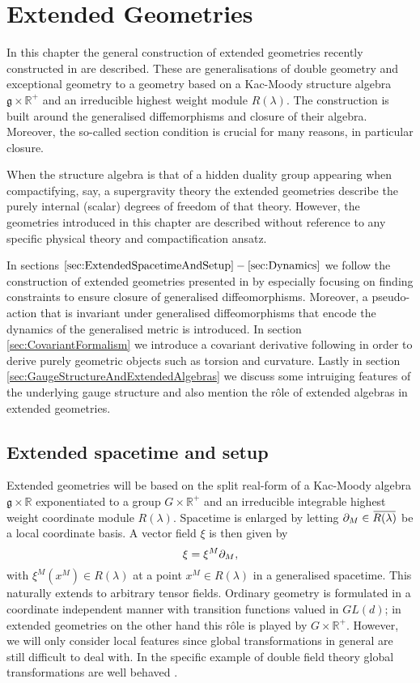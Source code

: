 \chapter{Extended Geometries}\label{chap:ExtendedGeometries}
In this chapter the general construction of extended geometries recently constructed in \cite{CederwallPalmkvist2017} are described. These are generalisations of double geometry and exceptional geometry to a geometry based on a Kac-Moody structure algebra $\mathfrak{g}\times\mathbb{R}^+$ and an irreducible highest weight module $R(\lambda)$. The construction is built around the generalised diffemorphisms and closure of their algebra. Moreover, the so-called section condition is crucial for many reasons, in particular closure.

When the structure algebra is that of a hidden duality group appearing when compactifying, say, a supergravity theory the extended geometries describe the purely internal (scalar) degrees of freedom of that theory. However, the geometries introduced in this chapter are described without reference to any specific physical theory and compactification ansatz. 

In sections $\ref{sec:ExtendedSpacetimeAndSetup}-\ref{sec:Dynamics}$ we follow the construction of extended geometries presented in \cite{CederwallPalmkvist2017} by especially focusing on finding constraints to ensure closure of generalised diffeomorphisms. Moreover, a pseudo-action that is invariant under generalised diffeomorphisms that encode the dynamics of the generalised metric is introduced. In section \ref{sec:CovariantFormalism} we introduce a covariant derivative following \cite{Cederwall:2013naa} in order to derive purely geometric objects such as torsion and curvature. Lastly in section \ref{sec:GaugeStructureAndExtendedAlgebras} we discuss some intruiging features of the underlying gauge structure and also mention the rôle of extended algebras in extended geometries. 

\section{Extended spacetime and setup\label{sec:ExtendedSpacetimeAndSetup}}
Extended geometries will be based on the split real-form of a Kac-Moody algebra $\mathfrak{g}\times\mathbb{R}$ exponentiated to a group $G\times\mathbb{R}^+$ and an irreducible integrable highest weight coordinate module $R(\lambda)$. Spacetime is enlarged by letting $\pd_M\in\overbar{R(\lambda)}$ be a local coordinate basis. A vector field $\xi$ is then given by 
\begin{equation}
    \xi = \xi^M\partial_M,
\end{equation}
with $\xi^M(x^M)\in R(\lambda)$ at a point $x^M\in R(\lambda)$ in a generalised spacetime. This naturally extends to arbitrary tensor fields. Ordinary geometry is formulated in a coordinate independent manner with transition functions valued in $GL(d)$; in extended geometries on the other hand this rôle is played by $G\times\mathbb{R}^+$. However, we will only consider local features since global transformations in general are still difficult to deal with. In the specific example of double field theory global transformations are well behaved \cite{Hohm:2012gk,Berman:2014jba}.

